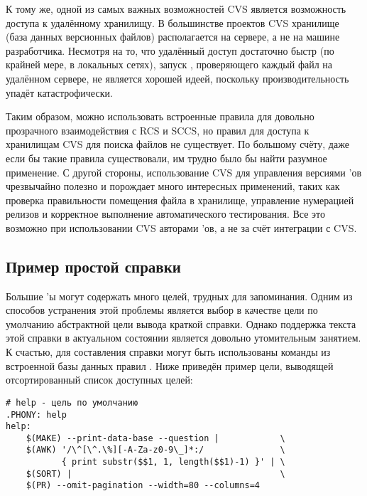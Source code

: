 К тому же, одной из самых важных возможностей CVS является возможность
доступа к удалённому хранилищу. В большинстве проектов CVS
хранилище (база данных версионных файлов) располагается на сервере,
а не на машине разработчика. Несмотря на то, что удалённый доступ
достаточно быстр (по крайней мере, в локальных сетях), запуск
\GNUmake{}, проверяющего каждый файл на удалённом сервере, не является
хорошей идеей, поскольку производительность упадёт катастрофически.

Таким образом, можно использовать встроенные правила для довольно
прозрачного взаимодействия с RCS и SCCS, но правил для доступа к
хранилищам CVS для поиска файлов не существует. По большому счёту,
даже если бы такие правила существовали, им трудно было бы найти
разумное применение. С другой стороны, использование CVS для
управления версиями \Makefile{}'ов чрезвычайно полезно и порождает
много интересных применений, таких как проверка правильности помещения
файла в хранилище, управление нумерацией релизов и корректное
выполнение автоматического тестирования. Все это возможно при
использовании CVS авторами \Makefile{}'ов, а не за счёт интеграции
\GNUmake{} с CVS.

\subsection{Пример простой справки}
Большие \Makefile{}'ы могут содержать много целей, трудных для
запоминания. Одним из способов устранения этой проблемы является
выбор в качестве цели по умолчанию абстрактной цели вывода краткой
справки. Однако поддержка текста этой справки в актуальном состоянии
является довольно утомительным занятием. К счастью, для составления
справки могут быть использованы команды из встроенной базы данных
правил \GNUmake{}. Ниже приведён пример цели, выводящей отсортированный
список доступных целей:

{\footnotesize
\begin{verbatim}
# help - цель по умолчанию
.PHONY: help
help:
    $(MAKE) --print-data-base --question |            \
    $(AWK) '/\^[\^.\%][-A-Za-z0-9\_]*:/               \
           { print substr($$1, 1, length($$1)-1) }' | \
    $(SORT) |                                         \
    $(PR) --omit-pagination --width=80 --columns=4
\end{verbatim}
}

